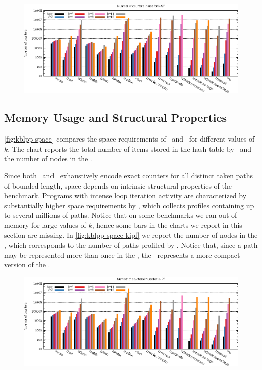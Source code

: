 \ifdefined\noauthorea
\begin{figure}[!ht]
\begin{center}
\includegraphics[width=\textwidth]{figures/kblpp-space/kblpp-space.eps}
\caption{\protect}
\end{center}
\end{figure}
\fi

\subsection{Memory Usage and Structural Properties}
\myfigure\ref{fig:kblpp-space} compares the space requirements of \blpp\ and \kblpp\ for different values of $k$. The chart reports the total number of items stored in the hash table by \blpp\ and the number of nodes in the \ksf.

Since both \blpp\ and \kblpp\ exhaustively encode exact counters for all distinct taken paths of bounded length, space depends on intrinsic structural properties of the benchmark. Programs with intense loop iteration activity are characterized by substantially higher space requirements by \kblpp, which collects profiles containing up to several millions of paths. Notice that on some benchmarks we ran out of memory for large values of $k$, hence some bars in the charts we report in this section are missing. In \myfigure\ref{fig:kblpp-space-kipf} we report the number of nodes in the \kipf, which corresponds to the number of paths profiled by \kblpp. Notice that, since a path may be represented more than once in the \ksf, the \kipf\ represents a more compact version of the \ksf.

\ifdefined\noauthorea
\begin{figure}[!ht]
\begin{center}
\includegraphics[width=\textwidth]{figures/kblpp-space-kipf/kblpp-space-kipf.eps}
\caption{\protect}
\end{center}
\end{figure}
\fi

